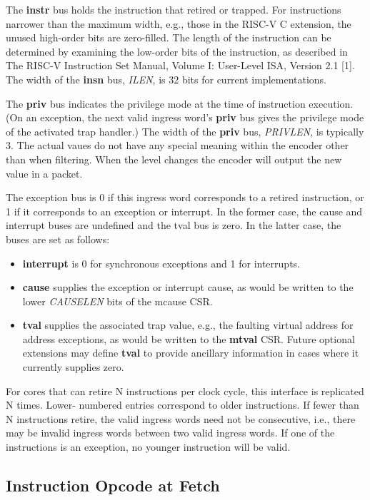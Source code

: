 The \textbf {instr} bus holds the instruction that retired or
trapped. For instructions narrower than the maximum width, e.g., those
in the RISC-V C extension, the unused high-order bits are
zero-filled. The length of the instruction can be determined by
examining the low-order bits of the instruction, as described in The
RISC-V Instruction Set Manual, Volume I: User-Level ISA, Version 2.1
[1]. The width of the \textbf {insn} bus, \textit {ILEN}, is 32 bits for current
implementations.

The \textbf {priv} bus indicates the privilege mode at the time of instruction
execution. (On an exception, the next valid ingress word's \textbf {priv} bus
gives the privilege mode of the activated trap handler.) The width of
the \textbf {priv} bus, \textit {PRIVLEN}, is typically 3. The actual vaues do not have any special meaning within the encoder other than when filtering. When the level changes the encoder will output the new value in a packet.

The exception bus is 0 if this ingress word corresponds to a retired
instruction, or 1 if it corresponds to an exception or interrupt.  In
the former case, the cause and interrupt buses are undefined and the
tval bus is zero.  In the latter case, the buses are set as
follows:

\begin{itemize}
  \item \textbf {interrupt} is 0 for synchronous exceptions and 1 for
    interrupts.
  \item \textbf {cause} supplies the exception or interrupt cause, as
    would be written to the lower \textit {CAUSELEN} bits of the mcause CSR.
  \item \textbf {tval} supplies the associated trap value, e.g., the
    faulting virtual address for address exceptions, as would be
    written to the \textbf {mtval} CSR. Future optional extensions may define \textbf {tval} to provide ancillary information in cases where it currently supplies zero.  
\end{itemize}

For cores that can retire N instructions per clock cycle, this
interface is replicated N times.  Lower- numbered entries correspond
to older instructions.  If fewer than N instructions retire, the valid
ingress words need not be consecutive, i.e., there may be invalid
ingress words between two valid ingress words. If one of the
instructions is an exception, no younger instruction will be valid.


\subsection {Instruction Opcode at Fetch}

